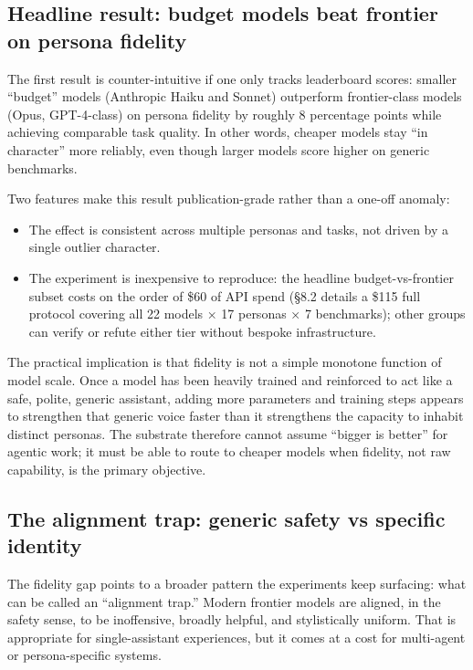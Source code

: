 \documentclass{article}
\providecommand{\tightlist}{\setlength{\itemsep}{0pt}\setlength{\parskip}{0pt}}
\begin{document}
\subsection{Headline result: budget models beat frontier on
persona
fidelity}\label{headline-result-budget-models-beat-frontier-on-persona-fidelity}

The first result is counter-intuitive if one only tracks leaderboard
scores: smaller ``budget'' models (Anthropic Haiku and Sonnet)
outperform frontier-class models (Opus, GPT-4-class) on persona fidelity
by roughly 8 percentage points while achieving comparable task quality.
In other words, cheaper models stay ``in character'' more reliably, even
though larger models score higher on generic benchmarks.

Two features make this result publication-grade rather than a one-off
anomaly:

\begin{itemize}
\tightlist
\item
  The effect is consistent across multiple personas and tasks, not
  driven by a single outlier character.
\item
  The experiment is inexpensive to reproduce: the headline
  budget-vs-frontier subset costs on the order of \$60 of API spend
  (§8.2 details a \$115 full protocol covering all 22 models × 17
  personas × 7 benchmarks); other groups can verify or refute either
  tier without bespoke infrastructure.
\end{itemize}

The practical implication is that fidelity is not a simple monotone
function of model scale. Once a model has been heavily trained and
reinforced to act like a safe, polite, generic assistant, adding more
parameters and training steps appears to strengthen that generic voice
faster than it strengthens the capacity to inhabit distinct personas.
The substrate therefore cannot assume ``bigger is better'' for agentic
work; it must be able to route to cheaper models when fidelity, not raw
capability, is the primary objective.

\subsection{The alignment trap: generic safety vs specific
identity}\label{the-alignment-trap-generic-safety-vs-specific-identity}

The fidelity gap points to a broader pattern the experiments keep
surfacing: what can be called an ``alignment trap.'' Modern frontier
models are aligned, in the safety sense, to be inoffensive, broadly
helpful, and stylistically uniform. That is appropriate for
single-assistant experiences, but it comes at a cost for multi-agent or
persona-specific systems.
\end{document}
